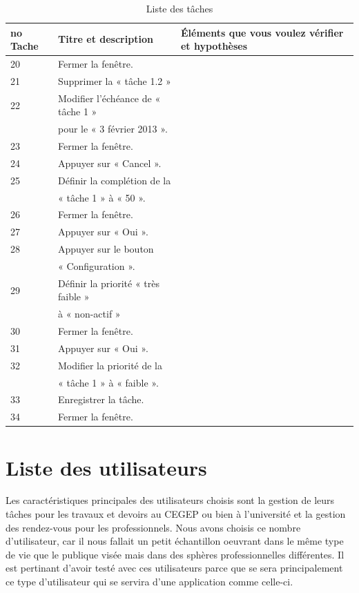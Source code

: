 \documentclass[letterpaper, oneside, 12pt, these, creativecommons]{thETS}
\begin{document}
\begin{table}
	\centering
	\begin{tabular}{|l|l|l|}
		\hline
		no Tache	& Titre et description		& Éléments que vous voulez vérifier et hypothèses 	\\ \hline 
		20		& Fermer la fenêtre.		&							\\ \hline
		21		& Supprimer la « tâche 1.2 »	&							\\ \hline
		22		& Modifier l’échéance de « tâche 1 »&							\\
				&  pour le « 3 février 2013 ».	&							\\ \hline
		23		& Fermer la fenêtre.		&							\\ \hline
		24		& Appuyer sur « Cancel ».		&							\\ \hline
		25		& Définir la complétion de la 	&							\\
				& « tâche 1 » à « 50 ».		&							\\ \hline
		26		& Fermer la fenêtre.		&							\\ \hline
		27		& Appuyer sur « Oui ».		&							\\ \hline
		28		& Appuyer sur le bouton 		&							\\
				& « Configuration ».		&							\\ \hline
		29		& Définir la priorité « très faible » &							\\
				& à « non-actif »			&							\\ \hline
		30		& Fermer la fenêtre.		&							\\ \hline
		31		& Appuyer sur « Oui ».		&							\\ \hline
		32		& Modifier la priorité de la 		&							\\
				& « tâche 1 » à « faible ».		&							\\ \hline
		33		& Enregistrer la tâche.		&							\\ \hline
		34		& Fermer la fenêtre.		&							\\ \hline
	\end{tabular}
	\caption{Liste des tâches}
\end{table}

\section{Liste des utilisateurs}

Les caractéristiques principales des utilisateurs choisis sont la gestion de leurs tâches pour les travaux et devoirs au CEGEP ou bien à l'université et la gestion des rendez-vous pour les professionnels. Nous avons choisis ce nombre d'utilisateur, car il nous fallait un petit échantillon oeuvrant dans le même type de vie que le publique visée mais dans des sphères professionnelles différentes. Il est pertinant d'avoir testé avec ces utilisateurs parce que se sera principalement ce type d'utilisateur qui se servira d'une application comme celle-ci.
\end{document}
